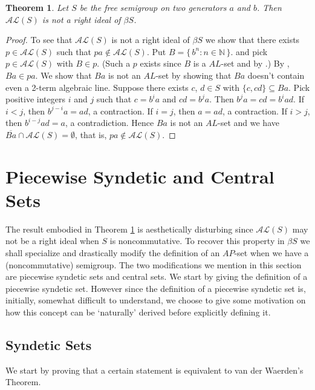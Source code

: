 \documentclass[12pt,showtrims]{memoir}
\theoremstyle{plain}
\newtheorem{thm}{Theorem}[section]
\theoremstyle{definition}
\newcommand{\bbN}{\mathbb{N}}
\newcommand{\AL}{\mathcal{AL}}
\begin{document}
\begin{thm}
  \label{thm:AL-not-left-ideal}
  Let $S$ be the free semigroup on two generators $a$ and $b$.
  Then $\AL(S)$ is not a right ideal of $\beta S$.
\end{thm}
\begin{proof}
  To see that $\AL(S)$ is not a right ideal of $\beta S$ we show that there exists $p \in \AL(S)$ such that $pa \not\in \AL(S)$. 
  Put $B = \{\, b^n : n \in \bbN \,\}$. and pick $p \in \AL(S)$ with $B \in p$. 
  (Such a $p$ exists since $B$ is a $AL$-set and by \cite[Theorem 3.11]{Hindman:1998fk}.)
  By \cite[Exercise 4.1.8(b)]{Hindman:1998fk}, $Ba \in pa$. 
  We show that $Ba$ is not an $AL$-set by showing that $Ba$ doesn't contain even a 2-term algebraic line. 
  Suppose there exists $c$, $d \in S$ with $\{c, cd\} \subseteq Ba$. 
  Pick positive integers $i$ and $j$ such that $c = b^ia$ and $cd = b^ja$.
  Then $b^ja = cd = b^iad$.
  If $i < j$, then $b^{j-i}a = ad$, a contraction.
  If $i = j$, then $a = ad$, a contraction.
  If $i > j$, then $b^{i-j}ad = a$, a contradiction.
  Hence $Ba$ is not an $AL$-set and we have $\overline{Ba} \cap \AL(S) = \emptyset$, that is, $pa \not\in \AL(S)$. 
\end{proof}

\section{Piecewise Syndetic and Central Sets}
The result embodied in Theorem \ref{thm:AL-not-left-ideal} is aesthetically disturbing since $\AL(S)$ may not be a right ideal when $S$ is noncommutative. 
To recover this property in $\beta S$ we shall specialize and drastically modify the definition of an $AP$-set when we have a (noncommutative) semigroup.
The two modifications we mention in this section are piecewise syndetic sets and central sets.
We start by giving the definition of a piecewise syndetic set. 
However since the definition of a piecewise syndetic set is, initially, somewhat difficult to understand, we choose to give some motivation on how this concept can be `naturally' derived before explicitly defining it.


\subsection{Syndetic Sets}
We start by proving that a certain statement is equivalent to van der Waerden's Theorem.
\end{document}
